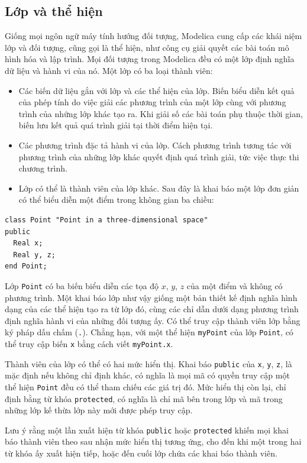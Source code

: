\subsection{Lớp và thể hiện}
Giống mọi ngôn ngữ máy tính hướng đối tượng, Modelica cung cấp các khái niệm lớp và đối tượng, cũng gọi là thể hiện, như công cụ giải quyết các bài toán mô hình hóa và lập trình. Mọi đối tượng trong Modelica đều có một lớp định nghĩa dữ liệu và hành vi của nó. Một lớp có ba loại thành viên:
\begin{itemize}
\item Các biến dữ liệu gắn với lớp và các thể hiện của lớp. Biến biểu diễn kết quả của phép tính do việc giải các phương trình của một lớp cùng với phương trình của những lớp khác tạo ra. Khi giải số các bài toán phụ thuộc thời gian, biến lưu kết quả quá trình giải tại thời điểm hiện tại.
\item Các phương trình đặc tả hành vi của lớp. Cách phương trình tương tác với phương trình của những lớp khác quyết định quá trình giải, tức việc thực thi chương trình.
\item Lớp có thể là thành viên của lớp khác. Sau đây là khai báo một lớp đơn giản có thể biểu diễn một điểm trong không gian ba chiều:
\end{itemize}
\begin{verbatim}
class Point "Point in a three-dimensional space"
public
  Real x;
  Real y, z;
end Point;
\end{verbatim}
Lớp \texttt{Point} có ba biến biểu diễn các tọa độ $x$, $y$, $z$ của một điểm và không có phương trình. Một khai báo lớp như vậy giống một bản thiết kế định nghĩa hình dạng của các thể hiện tạo ra từ lớp đó, cùng các chỉ dẫn dưới dạng phương trình định nghĩa hành vi của những đối tượng ấy. Có thể truy cập thành viên lớp bằng ký pháp dấu chấm (\texttt{.}). Chẳng hạn, với một thể hiện \texttt{myPoint} của lớp \texttt{Point}, có thể truy cập biến \texttt{x} bằng cách viết \texttt{myPoint.x}.

Thành viên của lớp có thể có hai mức hiển thị. Khai báo \texttt{public} của \texttt{x}, \texttt{y}, \texttt{z}, là mặc định nếu không chỉ định khác, có nghĩa là mọi mã có quyền truy cập một thể hiện \texttt{Point} đều có thể tham chiếu các giá trị đó. Mức hiển thị còn lại, chỉ định bằng từ khóa \texttt{protected}, có nghĩa là chỉ mã bên trong lớp và mã trong những lớp kế thừa lớp này mới được phép truy cập.

Lưu ý rằng một lần xuất hiện từ khóa \texttt{public} hoặc \texttt{protected} khiến mọi khai báo thành viên theo sau nhận mức hiển thị tương ứng, cho đến khi một trong hai từ khóa ấy xuất hiện tiếp, hoặc đến cuối lớp chứa các khai báo thành viên.

